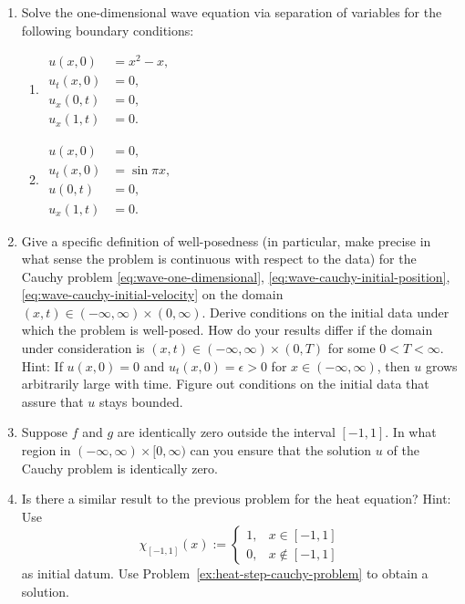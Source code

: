 \begin{enumerate}[label=\thesection.\arabic*.,ref=\thesection.\arabic*,start=25,series=book-problems]

\item\label{ex:wave-two-boundary-problems} Solve the one-dimensional wave equation via separation of variables for the following boundary conditions:\begin{enumerate}[label=(\alph*)]
\item $\begin{aligned}u(x,0)&=x^2-x,\\u_t(x,0)&=0,\\u_x(0,t)&=0,\\u_x(1,t)&=0.\end{aligned}$
\item $\begin{aligned}u(x,0)&=0,\\u_t(x,0)&=\sin\pi x,\\u(0,t)&=0,\\u_x(1,t)&=0.\end{aligned}$
\end{enumerate}

\item\label{ex:wave-cauchy-wellposedness} Give a specific definition of well-posedness (in particular, make precise in what sense the problem is continuous with respect to the data) for the Cauchy problem \eqref{eq:wave-one-dimensional}, \eqref{eq:wave-cauchy-initial-position}, \eqref{eq:wave-cauchy-initial-velocity} on the domain $(x,t)\in(-\infty,\infty)\times(0,\infty)$. Derive conditions on the initial data under which the problem is well-posed. How do your results differ if the domain under consideration is $(x,t)\in(-\infty,\infty)\times(0,T)$ for some $0<T<\infty$. Hint: If $u(x,0)=0$ and $u_t(x,0)=\epsilon>0$ for $x\in(-\infty,\infty)$, then $u$ grows arbitrarily large with time. Figure out conditions on the initial data that assure that $u$ stays bounded.

\item\label{ex:wave-finite-propagation-region} Suppose $f$ and $g$ are identically zero outside the interval $[-1,1]$. In what region in $(-\infty,\infty)\times[0,\infty)$ can you ensure that the solution $u$ of the Cauchy problem is identically zero.

\item\label{ex:heat-propagation-comparison} Is there a similar result to the previous problem for the heat equation? Hint: Use
\[
\chi_{[-1,1]}(x):=\begin{cases}1,&x\in[-1,1]\\0,&x\notin[-1,1]\end{cases}
\]
as initial datum. Use Problem~\ref{ex:heat-step-cauchy-problem} to obtain a solution.


\end{enumerate}
